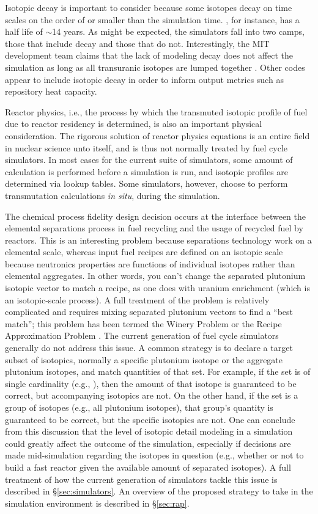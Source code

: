 Isotopic decay is important to consider because some isotopes decay on time
scales on the order of or smaller than the simulation time. , for
instance, has a half life of $\sim$14 years. As might be expected, the
simulators fall into two camps, those that include decay and those that do
not. Interestingly, the MIT development team claims that the lack of modeling
decay does not affect the simulation as long as all transuranic isotopes are
lumped together \cite{guerin_impact_2009}. Other codes appear to include
isotopic decay in order to inform output metrics such as repository heat
capacity. 

Reactor physics, i.e., the process by which the transmuted isotopic profile of
fuel due to reactor residency is determined, is also an important physical
consideration. The rigorous solution of reactor physics equations is an entire
field in nuclear science unto itself, and is thus not normally treated by fuel
cycle simulators. In most cases for the current suite of simulators, some amount
of calculation is performed before a simulation is run, and isotopic profiles
are determined via lookup tables. Some simulators, however, choose to perform
transmutation calculations \textit{in situ}, during the simulation.

The chemical process fidelity design decision occurs at the interface between
the elemental separations process in fuel recycling and the usage of recycled
fuel by reactors. This is an interesting problem because separations technology
work on a elemental scale, whereas input fuel recipes are defined on an isotopic
scale because neutronics properties are functions of individual isotopes rather
than elemental aggregates. In other words, you can't change the separated
plutonium isotopic vector to match a recipe, as one does with uranium enrichment
(which is an isotopic-scale process). A full treatment of the problem is
relatively complicated and requires mixing separated plutonium vectors to find a
``best match''; this problem has been termed the Winery Problem or the Recipe
Approximation Problem \cite{oliver_geniusv2:_2009}. The current generation of
fuel cycle simulators generally do not address this issue. A common strategy is
to declare a target subset of isotopics, normally a specific plutonium isotope
or the aggregate plutonium isotopes, and match quantities of that set. For
example, if the set is of single cardinality (e.g.,
), then the amount of that isotope is guaranteed to be correct,
but accompanying isotopics are not. On the other hand, if the set is a group of
isotopes (e.g., all plutonium isotopes), that group's quantity is guaranteed to
be correct, but the specific isotopics are not. One can conclude from this
discussion that the level of isotopic detail modeling in a simulation could
greatly affect the outcome of the simulation, especially if decisions are made
mid-simulation regarding the isotopes in question (e.g., whether or not to build
a fast reactor given the available amount of separated isotopes). A full
treatment of how the current generation of simulators tackle this issue is
described in \S\ref{sec:simulators}. An overview of the proposed strategy to
take in the \Cyclus simulation environment is described in \S\ref{sec:rap}.

